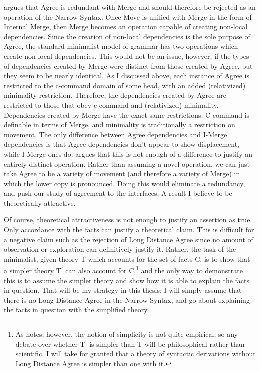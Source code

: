 \documentclass[MilwayThesis]{subfiles}
\begin{document}
\textcite{hornstein2009theory} argues that Agree is redundant with Merge and should therefore be rejected as an operation of the Narrow Syntax.
Once Move is unified with Merge in the form of Internal Merge, then Merge becomes an operation capable of creating non-local dependencies.
Since the creation of non-local dependencies is the sole purpose of Agree, the standard minimalist model of grammar has two operations which create non-local dependencies.
This would not be an issue, however, if the types of dependencies created by Merge were distinct from those created by Agree, but they seem to be nearly identical.
As I discussed above, each instance of Agree is restricted to the c-command domain of some head, with an added (relativized) minimality restriction.
Therefore, the dependencies created by Agree are restricted to those that obey c-command and (relativized) minimality.
Dependencies created by Merge have the exact same restrictions:
C-command is definable in terms of Merge, and minimality is traditionally a restriction on movement.
The only difference between Agree dependencies and I-Merge dependencies is that Agree dependencies don't appear to show displacement, while I-Merge ones do.
\textcite{hornstein2009theory} argues that this is not enough of a difference to justify an entirely distinct operation.
Rather than assuming a novel operation, we can just take Agree to be a variety of movement (and therefore a variety of Merge) in which the lower copy is pronounced.
Doing this would eliminate a redundancy, and push our study of agreement to the interfaces, A result I believe to be theoretically attractive.

Of course, theoretical attractiveness is not enough to justify an assertion as true.
Only accordance with the facts can justify a theoretical claim.
This is difficult for a negative claim such as the rejection of Long Distance Agree since no amount of observation or exploration can definitively justify it.
Rather, the task of the minimalist, given theory T which accounts for the set of facts C, is to show that a simpler theory T$^\prime$ can also account for C,\footnote{
As \textcite{chomsky1965aspects} notes, however, the notion of simplicity is not quite empirical, so any debate over whether T$^\prime$ is simpler than T will be philosophical rather than scientific.
I will take for granted that a theory of syntactic derivations without Long Distance Agree is simpler than one with it.}
 and the only way to demonstrate this is to assume the simpler theory and show how it is able to explain the facts in question.
That will be my strategy in this thesis: I will simply assume that there is no Long Distance Agree in the Narrow Syntax, and go about explaining the facts in question with the simplified theory.
\end{document}
